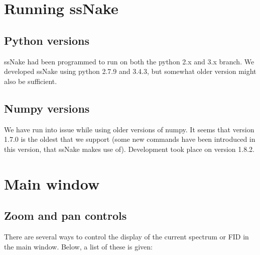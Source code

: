 \documentclass[11pt,a4paper]{article}
\renewcommand\cfttoctitlefont{\color{black!70}\Huge\fontfamily{SourceSansPro-LF}\bfseries}
\begin{document}


\thispagestyle{empty}
\newpage
\mbox{}


\renewcommand\cfttoctitlefont{\color{black}\Huge\fontfamily{SourceSansPro-LF}\bfseries}
\setcounter{tocdepth}{2}
\tableofcontents %

\renewcommand\cfttoctitlefont{\color{black!70}\Huge\fontfamily{SourceSansPro-LF}\bfseries}



\section{Running ssNake}
\subsection{Python versions}
ssNake had been programmed to run on both the python 2.x and 3.x branch. We developed ssNake using python 2.7.9 and 3.4.3, but somewhat older version might also be sufficient. 

\subsection{Numpy versions}
We have run into issue while using older versions of numpy. It seems that version 1.7.0 is the oldest that we support (some new commands have been introduced in this version, that ssNake makes use of). Development took place on version 1.8.2.


\section{Main window}
\subsection{Zoom and pan controls}
There are several ways to control the display of the current spectrum or FID in the main window. Below, a list of these is given:
\end{document}
